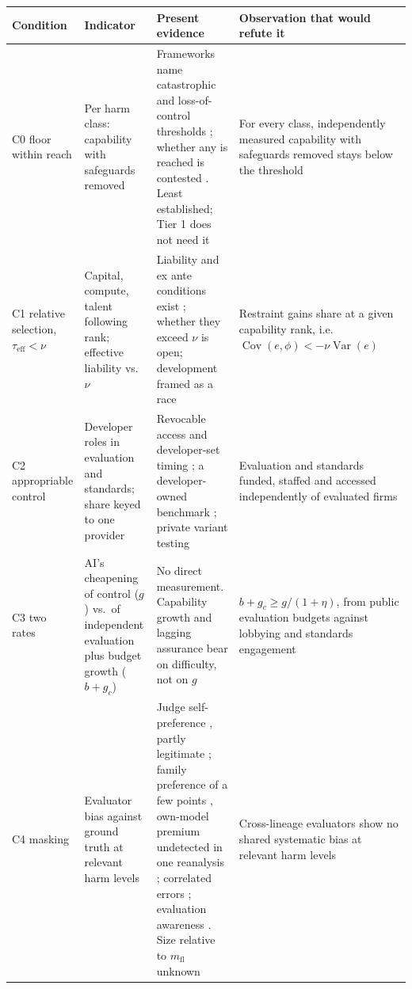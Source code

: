 \documentclass[letterpaper]{article} %
\theoremstyle{definition}
\newcommand{\mfl}{m_{\mathrm{fl}}}
\newcommand{\taueff}{\tau_{\mathrm{eff}}}
\begin{document}
\begin{table}[t]
\centering
\small
\setlength{\tabcolsep}{3.5pt}
\begin{tabular}{@{}>{\raggedright\arraybackslash}p{2.4cm}>{\raggedright\arraybackslash}p{3.9cm}>{\raggedright\arraybackslash}p{6.4cm}>{\raggedright\arraybackslash}p{4.4cm}@{}}
\toprule
Condition & Indicator & Present evidence & Observation that would refute it \\
\midrule
C0 floor within reach & Per harm class: capability with safeguards removed & Frameworks name catastrophic and loss-of-control thresholds \citep{seoul2024,tc260framework2024,gpaicode2025}; whether any is reached is contested \citep{bengio2025report}. Least established; Tier 1 does not need it & For every class, independently measured capability with safeguards removed stays below the threshold \\
C1 relative selection, $\taueff<\nu$ & Capital, compute, talent following rank; effective liability vs.\ $\nu$ & Liability and ex ante conditions exist \citep{euaiact2024,sb53}; whether they exceed $\nu$ is open; development framed as a race \citep{whitehouse2025,statecouncil2017} & Restraint gains share at a given capability rank, i.e.\ $\operatorname{Cov}(e,\phi)<-\nu\operatorname{Var}(e)$ \\
C2 appropriable control & Developer roles in evaluation and standards; share keyed to one provider & Revocable access \citep{longpre2024} and developer-set timing \citep{metr2025o3}; a developer-owned benchmark \citep{besiroglu2025frontiermath}; private variant testing \citep{singh2025} & Evaluation and standards funded, staffed and accessed independently of evaluated firms \\
C3 two rates & AI's cheapening of control ($g$) vs.\ of independent evaluation plus budget growth ($b+g_c$) & No direct measurement. Capability growth \citep{kwa2025} and lagging assurance \citep{bengio2025report,aisi2025trends} bear on difficulty, not on $g$ & $b+g_c\ge g/(1+\eta)$, from public evaluation budgets against lobbying and standards engagement \\
C4 masking & Evaluator bias against ground truth at relevant harm levels & Judge self-preference \citep{panickssery2024,chen2025selfpref}, partly legitimate \citep{chen2025reason}; family preference of a few points \citep{awuni2026}, own-model premium undetected in one reanalysis \citep{zatuchin2026}; correlated errors \citep{kim2025,goel2025}; evaluation awareness \citep{needham2025}. Size relative to $\mfl$ unknown & Cross-lineage evaluators show no shared systematic bias at relevant harm levels \\

\end{tabular}
\end{table}
\end{document}

